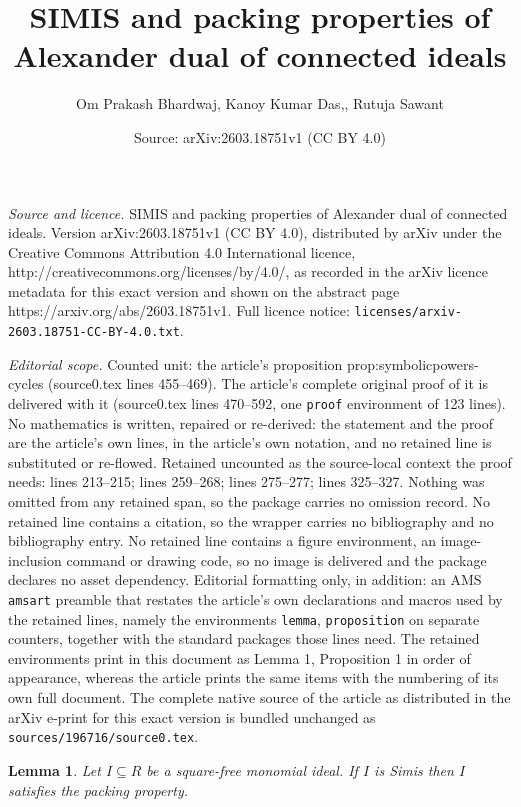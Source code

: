 \documentclass[10pt,a4paper]{amsart}
\title{SIMIS and packing properties of Alexander dual of connected ideals}
\author{Om Prakash Bhardwaj, Kanoy Kumar Das,, Rutuja Sawant}
\date{Source: arXiv:2603.18751v1 (CC BY 4.0)}
\newtheorem{lemma}{Lemma}
\begin{document}
\maketitle

\noindent\emph{Source and licence.} SIMIS and packing properties of Alexander dual of connected ideals. Version arXiv:2603.18751v1 (CC BY 4.0), distributed by arXiv under the Creative Commons Attribution 4.0 International licence, http://creativecommons.org/licenses/by/4.0/, as recorded in the arXiv licence metadata for this exact version and shown on the abstract page https://arxiv.org/abs/2603.18751v1. Full licence notice: \texttt{licenses/arxiv-2603.18751-CC-BY-4.0.txt}.\par\smallskip

\noindent\textit{Editorial scope.} Counted unit: the article's proposition prop:symbolicpowers-cycles (source0.tex lines 455--469). The article's complete original proof of it is delivered with it (source0.tex lines 470--592, one \texttt{proof} environment of 123 lines). No mathematics is written, repaired or re-derived: the statement and the proof are the article's own lines, in the article's own notation, and no retained line is substituted or re-flowed.  Retained uncounted as the source-local context the proof needs: lines 213--215; lines 259--268; lines 275--277; lines 325--327.  Nothing was omitted from any retained span, so the package carries no omission record.  No retained line contains a citation, so the wrapper carries no bibliography and no bibliography entry.  No retained line contains a figure environment, an image-inclusion command or drawing code, so no image is delivered and the package declares no asset dependency.  Editorial formatting only, in addition: an AMS \texttt{amsart} preamble that restates the article's own declarations and macros used by the retained lines, namely the environments \texttt{lemma}, \texttt{proposition} on separate counters, together with the standard packages those lines need.  The retained environments print in this document as Lemma 1, Proposition 1 in order of appearance, whereas the article prints the same items with the numbering of its own full document.  The complete native source of the article as distributed in the arXiv e-print for this exact version is bundled unchanged as \texttt{sources/196716/source0.tex}.
\begin{lemma}\label{lem: Simis implies packed}
    Let $I\subseteq R$ be a square-free monomial ideal. If $I$ is Simis then $I$ satisfies the packing property. 
\end{lemma}
\end{document}
